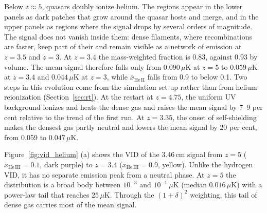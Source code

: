 Below $z \approx 5$, quasars doubly ionize helium. The  regions appear in the lower panels as dark patches that grow around the quasar hosts and merge, and in the upper panels as regions where the signal drops by several orders of magnitude. The signal does not vanish inside them: dense filaments, where recombinations are faster, keep part of their  and remain visible as a network of emission at $z = 3.5$ and $z = 3$. At $z = 3.4$ the mass-weighted  fraction is 0.83, against 0.93 by volume. The mean signal therefore falls only from $0.090\,\mu\mathrm{K}$ at $z = 5$ to $0.059\,\mu\mathrm{K}$ at $z = 3.4$ and $0.044\,\mu\mathrm{K}$ at $z = 3$, while $\bar{x}_\mathrm{He\,II}$ falls from 0.9 to below 0.1. Two steps in this evolution come from the simulation set-up rather than from helium reionization (Section~\ref{sec:rt}). At the restart at $z = 4.75$, the uniform UV background ionizes and heats the dense gas and raises the mean signal by 7--9 per cent relative to the trend of the first run. At $z = 3.35$, the onset of self-shielding makes the densest gas partly neutral and lowers the mean signal by 20 per cent, from 0.059 to $0.047\,\mu\mathrm{K}$.



    \caption{Evolution of the VID and its summary statistics for the 3.46\,cm brightness temperature, from the gas-cell maps. Colors indicate redshift from $z = 5$ (dark purple) to $z = 3.4$ (yellow), corresponding to a global ionized fraction $\bar{x}_\mathrm{He\,III}$ increasing from $0.1$ to $0.9$. Top (a): the probability density function. Bottom (b): the redshift evolution of the standard deviation (multiplied by 100), skewness, excess kurtosis and BC from $z = 6$ to $z = 3$, at the redshifts of the full snapshots. The blue dotted line marks $\mathrm{BC} = 5/9$.}



Figure~\ref{fig:vid_helium} (a) shows the VID of the 3.46\,cm signal from $z = 5$ ($\bar{x}_\mathrm{He\,III} = 0.1$, dark purple) to $z = 3.4$ ($\bar{x}_\mathrm{He\,III} = 0.9$, yellow). Unlike the hydrogen VID, it has no separate emission peak from a neutral phase. At $z = 5$ the distribution is a broad body between $10^{-3}$ and $10^{-1}\,\mu\mathrm{K}$ (median $0.016\,\mu\mathrm{K}$) with a power-law tail that reaches $25\,\mu\mathrm{K}$. Through the $(1+\delta)^2$ weighting, this tail of dense gas carries most of the mean signal.

